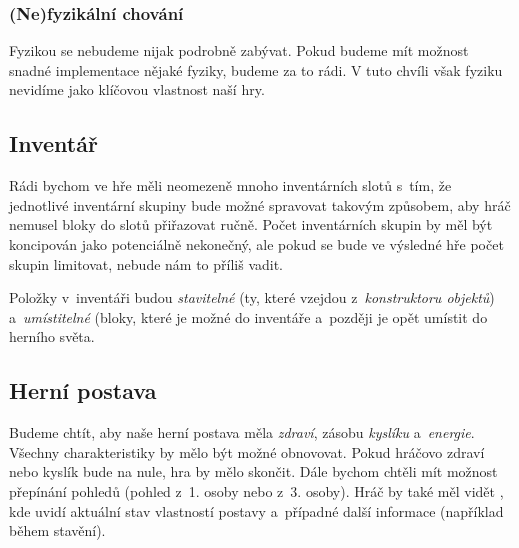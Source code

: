 \subsubsection{(Ne)fyzikální chování}

Fyzikou se nebudeme nijak podrobně zabývat. Pokud budeme mít možnost snadné implementace nějaké fyziky, budeme za to rádi. V tuto chvíli však fyziku nevidíme jako klíčovou vlastnost naší hry. 

\subsection{Inventář}
\label{subsec:inventory}
Rádi bychom ve hře měli neomezeně mnoho inventárních slotů s~tím, že jednotlivé inventární skupiny bude možné spravovat takovým způsobem, aby hráč nemusel bloky do slotů přiřazovat ručně. Počet inventárních skupin by měl být koncipován jako potenciálně nekonečný, ale pokud se bude ve výsledné hře počet skupin limitovat, nebude nám to příliš vadit.

Položky v~inventáři budou \textit{stavitelné} (ty, které vzejdou z~\textit{konstruktoru objektů}) a~\textit{umístitelné} (bloky, které je možné  do inventáře a~později je opět umístit do herního světa.

\subsection{Herní postava}
\label{subsec:postava}
Budeme chtít, aby naše herní postava měla \textit{zdraví}, zásobu \textit{kyslíku} a~\textit{energie}. Všechny charakteristiky by mělo být možné obnovovat. Pokud hráčovo zdraví nebo kyslík bude na nule, hra by mělo skončit. Dále bychom chtěli mít možnost přepínání pohledů (pohled z~1. osoby nebo z~3. osoby). Hráč by také měl vidět \HUD{}, kde uvidí aktuální stav vlastností postavy a~případné další informace (například během stavění).



